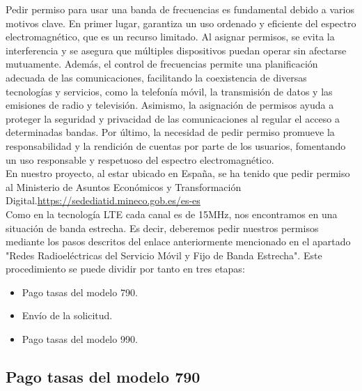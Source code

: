 Pedir permiso para usar una banda de frecuencias es fundamental debido a varios motivos clave. En primer lugar, garantiza un uso ordenado y eficiente del espectro electromagnético, que es un recurso limitado. Al asignar permisos, se evita la interferencia y se asegura que múltiples dispositivos puedan operar sin afectarse mutuamente. Además, el control de frecuencias permite una planificación adecuada de las comunicaciones, facilitando la coexistencia de diversas tecnologías y servicios, como la telefonía móvil, la transmisión de datos y las emisiones de radio y televisión. Asimismo, la asignación de permisos ayuda a proteger la seguridad y privacidad de las comunicaciones al regular el acceso a determinadas bandas. Por último, la necesidad de pedir permiso promueve la responsabilidad y la rendición de cuentas por parte de los usuarios, fomentando un uso responsable y respetuoso del espectro electromagnético.\\

En nuestro proyecto, al estar ubicado en España, se ha tenido que pedir permiso al Ministerio de Asuntos Económicos y Transformación Digital.\url{https://sedediatid.mineco.gob.es/es-es}\\

Como en la tecnología LTE cada canal es de 15MHz, nos encontramos en una situación de banda estrecha. Es decir, deberemos pedir nuestros permisos mediante los pasos descritos del enlace anteriormente mencionado en el apartado "Redes Radioeléctricas del Servicio Móvil y Fijo de Banda Estrecha". Este procedimiento se puede dividir por tanto en tres etapas:

\begin{itemize}
\item Pago tasas del modelo 790.
\item Envío de la solicitud.
\item Pago tasas del modelo 990.
\end{itemize}

\subsection{Pago tasas del modelo 790}

